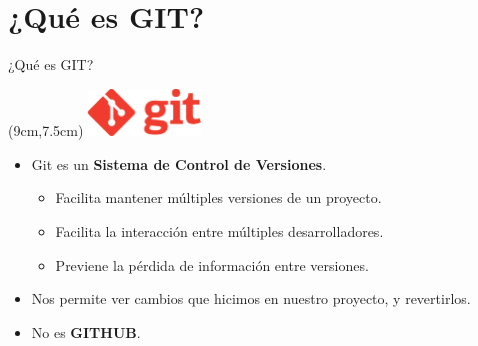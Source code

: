 \documentclass{beamer}
\begin{document}
    
    
    \section{¿Qué es GIT?}
    \begin{frame}{¿Qué es GIT?}
        \begin{textblock*}{3cm}(9cm,7.5cm) %
        \includegraphics[width=3cm]{gitlogo.pdf}
        \end{textblock*}
        \begin{itemize}
            \item Git es un \textbf{Sistema de Control de Versiones}.\\\pause
            \begin{itemize}
                \item Facilita mantener múltiples versiones de un proyecto.\pause
                \item Facilita la interacción entre múltiples desarrolladores.\pause
                \item Previene la pérdida de información entre versiones.\pause
            \end{itemize}
            \item Nos permite ver cambios que hicimos en nuestro proyecto, y revertirlos.\pause
            \item No es \textbf{GITHUB}.
        \end{itemize}
    \end{frame}
    
\end{document}
